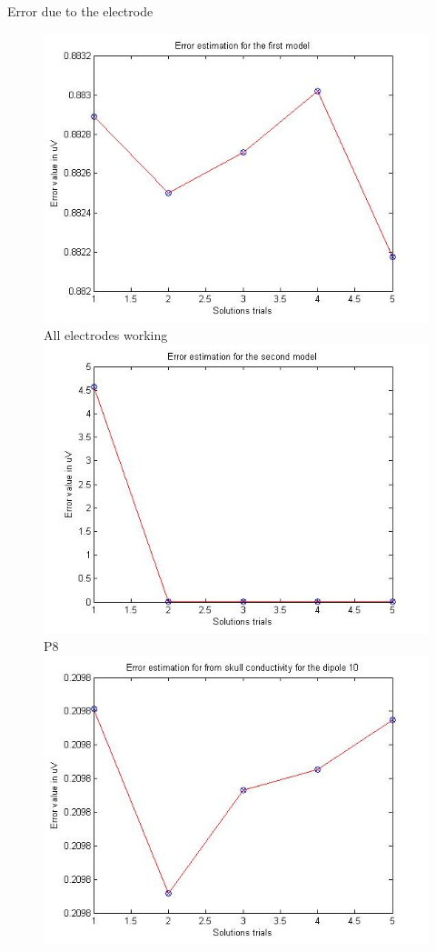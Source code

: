 \documentclass[t,12pt,english
\ifx\beamermode\undefined\else,\beamermode\fi
]{beamer}
\begin{document}
\begin{frame}{Error due to the electrode}
\begin{figure}[!htbp]
%
\centering
\includegraphics[width=1\textwidth]{54.jpg}\\
\tiny{All electrodes working}
\endminipage\hfill
{}%
\centering
\includegraphics[width=1\textwidth]{23.jpg}\\
\tiny{P8}\label{A23}
\endminipage\hfill
{}%
\centering
\includegraphics[width=1\textwidth]{34.jpg}\\

\end{figure}
\end{frame}
\end{document}
